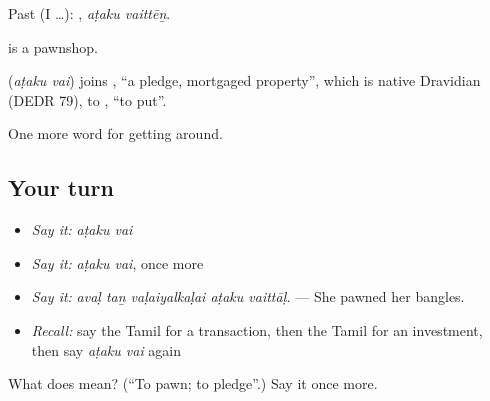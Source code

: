 Past (I …):  , \emph{aṭaku vaittēṉ}.

  is a pawnshop.

\begin{cousinweb}
\textbf{ } (\emph{aṭaku vai}) joins , \textquotedblleft{}a pledge, mortgaged property\textquotedblright{}, which is native Dravidian (DEDR 79), to , \textquotedblleft{}to put\textquotedblright{}.
\end{cousinweb}

\begin{grammarlens}[title={What you've built}]
One more word for getting around.
\end{grammarlens}

\subsection*{Your turn}
\begin{itemize}
\raggedright
  \item \emph{Say it:} \emph{aṭaku vai}
  \item \emph{Say it:} \emph{aṭaku vai}, once more
  \item \emph{Say it:} \emph{avaḷ taṉ vaḷaiyalkaḷai aṭaku vaittāḷ.} — She pawned her bangles.
  \item \emph{Recall:} say the Tamil for a transaction, then the Tamil for an investment, then say \emph{aṭaku vai} again
\end{itemize}

\begin{tcolorbox}[breakable,colback=teal!4,colframe=teal!35!black,title={Before you move on}]
What does   mean? (\textquotedblleft{}To pawn; to pledge\textquotedblright{}.) Say it once more.
\end{tcolorbox}

